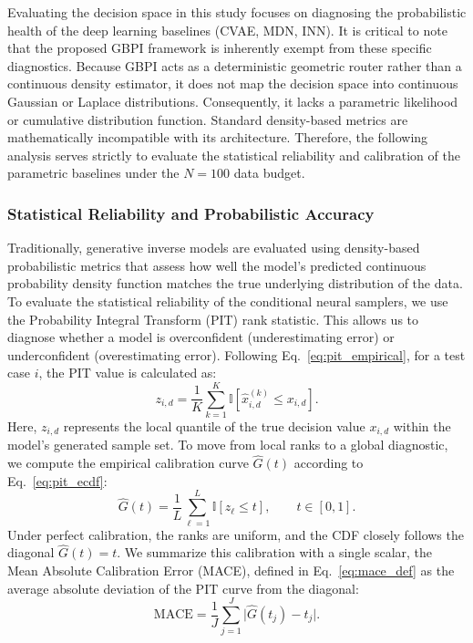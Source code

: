 Evaluating the decision space in this study focuses on diagnosing the probabilistic health of the deep learning baselines (CVAE, MDN, INN). It is critical to note that the proposed GBPI framework is inherently exempt from these specific diagnostics. Because GBPI acts as a deterministic geometric router rather than a continuous density estimator, it does not map the decision space into continuous Gaussian or Laplace distributions. Consequently, it lacks a parametric likelihood or cumulative distribution function. Standard density-based metrics are mathematically incompatible with its architecture. Therefore, the following analysis serves strictly to evaluate the statistical reliability and calibration of the parametric baselines under the $N=100$ data budget.

\subsubsection{Statistical Reliability and Probabilistic Accuracy}\label{subsubsec:prob_diagnostics}

Traditionally, generative inverse models are evaluated using density-based probabilistic metrics that assess how well the model's predicted continuous probability density function matches the true underlying distribution of the data. To evaluate the statistical reliability of the conditional neural samplers, we use the Probability Integral Transform (PIT) rank statistic. This allows us to diagnose whether a model is overconfident (underestimating error) or underconfident (overestimating error). Following Eq.~\eqref{eq:pit_empirical}, for a test case $i$, the PIT value is calculated as:
\begin{equation}
    z_{i,d} = \frac{1}{K}\sum_{k=1}^{K}\mathbb{I}\!\left[\widehat{x}^{(k)}_{i,d}\le x_{i,d}\right].
\end{equation}
Here, $z_{i,d}$ represents the local quantile of the true decision value $x_{i,d}$ within the model's generated sample set. To move from local ranks to a global diagnostic, we compute the empirical calibration curve $\widehat{G}(t)$ according to Eq.~\eqref{eq:pit_ecdf}:
\begin{equation}
    \widehat{G}(t) = \frac{1}{L}\sum_{\ell=1}^{L}\mathbb{I}\!\left[z_\ell \le t\right], \qquad t\in[0,1].
\end{equation}
Under perfect calibration, the ranks are uniform, and the CDF closely follows the diagonal $\widehat{G}(t) = t$. We summarize this calibration with a single scalar, the Mean Absolute Calibration Error (MACE), defined in Eq.~\eqref{eq:mace_def} as the average absolute deviation of the PIT curve from the diagonal:
\begin{equation}
    \mathrm{MACE} = \frac{1}{J}\sum_{j=1}^{J}\big|\widehat{G}(t_j)-t_j\big|.
    \label{eq:mace_def}
\end{equation}

